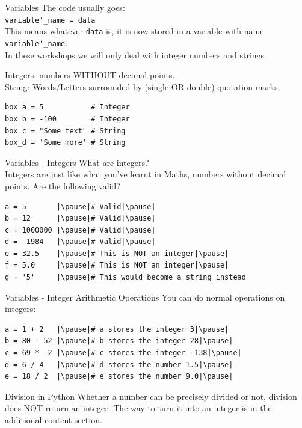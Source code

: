 \documentclass[dvipsnames, svgnames, x11names, handout]{beamer}
\begin{document}
\begin{frame}[fragile]{Variables}
The code usually goes:\\
\texttt{variable\char`\_name = data}\\
This means whatever \texttt{data} is, it is now stored in a variable with name \texttt{variable\char`\_name}.
\vspace{1em}\\
In these workshops we will only deal with integer numbers and strings.

Integers: numbers WITHOUT decimal points.\\
String: Words/Letters surrounded by (single OR double) quotation marks.

\begin{verbatim}
box_a = 5           # Integer
box_b = -100        # Integer
box_c = "Some text" # String
box_d = 'Some more' # String
\end{verbatim}
\end{frame}

\begin{frame}[fragile]{Variables - Integers}
What are integers?\pause\\
Integers are just like what you've learnt in Maths, numbers without decimal points. Are the following valid?\pause
\begin{verbatim}
a = 5       |\pause|# Valid|\pause|
b = 12      |\pause|# Valid|\pause|
c = 1000000 |\pause|# Valid|\pause|
d = -1984   |\pause|# Valid|\pause|
e = 32.5    |\pause|# This is NOT an integer|\pause|
f = 5.0     |\pause|# This is NOT an integer|\pause|
g = '5'     |\pause|# This would become a string instead
\end{verbatim}
\end{frame}

\begin{frame}[fragile]{Variables - Integer Arithmetic Operations}
You can do normal operations on integers:
\begin{verbatim}
a = 1 + 2   |\pause|# a stores the integer 3|\pause|
b = 80 - 52 |\pause|# b stores the integer 28|\pause|
c = 69 * -2 |\pause|# c stores the integer -138|\pause|
d = 6 / 4   |\pause|# d stores the number 1.5|\pause|
e = 18 / 2  |\pause|# e stores the number 9.0|\pause|
\end{verbatim}
\begin{alertblock}{Division in Python}
Whether a number can be precisely divided or not, division does NOT return an integer.
The way to turn it into an integer is in the additional content section.
\end{alertblock}
\end{frame}
\end{document}
